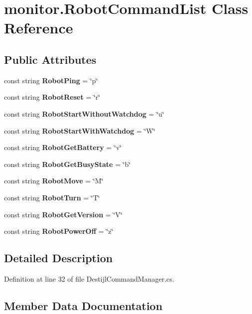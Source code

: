 \section{monitor.\+Robot\+Command\+List Class Reference}
\label{classmonitor_1_1_robot_command_list}
\subsection*{Public Attributes}
\begin{DoxyCompactItemize}
\item 
const string \textbf{ Robot\+Ping} = \char`\"{}p\char`\"{}
\item 
const string \textbf{ Robot\+Reset} = \char`\"{}r\char`\"{}
\item 
const string \textbf{ Robot\+Start\+Without\+Watchdog} = \char`\"{}u\char`\"{}
\item 
const string \textbf{ Robot\+Start\+With\+Watchdog} = \char`\"{}W\char`\"{}
\item 
const string \textbf{ Robot\+Get\+Battery} = \char`\"{}v\char`\"{}
\item 
const string \textbf{ Robot\+Get\+Busy\+State} = \char`\"{}b\char`\"{}
\item 
const string \textbf{ Robot\+Move} = \char`\"{}M\char`\"{}
\item 
const string \textbf{ Robot\+Turn} = \char`\"{}T\char`\"{}
\item 
const string \textbf{ Robot\+Get\+Version} = \char`\"{}V\char`\"{}
\item 
const string \textbf{ Robot\+Power\+Off} = \char`\"{}z\char`\"{}
\end{DoxyCompactItemize}


\subsection{Detailed Description}


Definition at line 32 of file Destijl\+Command\+Manager.\+cs.



\subsection{Member Data Documentation}
\mbox{\label{classmonitor_1_1_robot_command_list_a374eb526d14b8499e47b065230afeed0}} 
